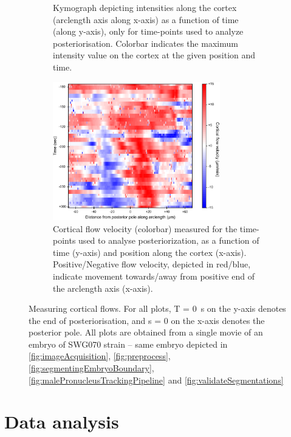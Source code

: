 \begin{figure}[h]
\begin{subfigure}[t]{0.45\textwidth}
    \caption{Kymograph depicting intensities along the cortex (arclength axis along x-axis) as a function of time (along y-axis), only for time-points used to analyze posteriorisation. Colorbar indicates the maximum intensity value on the cortex at the given position and time.} 
    \label{subfig:crtxFlowMeasurement-kymographPosteriorization}
\end{subfigure}

\begin{subfigure}{\textwidth}
    \centering
    \includegraphics[width=0.8\textwidth]{ExpMethods/FigCrtxFlows/crtxFlows.pdf}
    \caption{Cortical flow velocity (colorbar) measured for the time-points used to analyse posteriorization, as a function of time (y-axis) and position along the cortex (x-axis). Positive/Negative flow velocity, depicted in red/blue, indicate movement towards/away from positive end of the arclength axis (x-axis).} 
    \label{subfig:crtxFlowMeasurement-crtxFlows}
\end{subfigure}

\caption[Image analysis: Measuring cortical flows]{Measuring cortical flows. For all plots, T = \SI{0}{\second} on the y-axis denotes the end of posteriorisation, and s = \SI{0}{\unitLength} on the x-axis denotes the posterior pole. All plots are obtained from a single movie of an embryo of SWG070 strain -- same embryo depicted in \autoref{fig:imageAcquisition}, \autoref{fig:preprocess}, \autoref{fig:segmentingEmbryoBoundary}, \autoref{fig:malePronucleusTrackingPipeline} and \autoref{fig:validateSegmentations}}
\label{fig:crtxFlowMeasurement}
\end{figure}

\section{Data analysis}\label{sec:statAnalysis}

